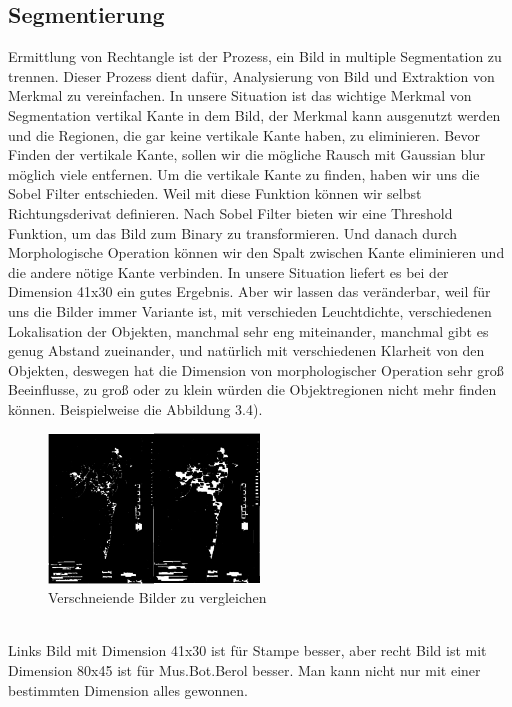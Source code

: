 \documentclass[10pt,a4paper]{report}
\begin{document}
\subsection{Segmentierung}
Ermittlung von Rechtangle ist der Prozess, ein Bild in multiple Segmentation zu trennen. Dieser Prozess dient dafür, Analysierung von Bild und Extraktion von Merkmal zu vereinfachen.\cite{5} 
In unsere Situation ist das wichtige Merkmal von Segmentation vertikal Kante in dem Bild, der Merkmal kann ausgenutzt werden und die Regionen, die gar keine vertikale Kante haben, zu eliminieren. 
Bevor Finden der vertikale Kante, sollen wir die mögliche Rausch mit Gaussian blur möglich viele entfernen. Um die vertikale Kante zu finden, haben wir uns die Sobel Filter entschieden. Weil mit diese Funktion können wir selbst Richtungsderivat definieren. 
Nach Sobel Filter bieten wir eine Threshold Funktion, um das Bild zum Binary zu transformieren. Und danach durch Morphologische Operation können wir den Spalt zwischen Kante eliminieren und die andere nötige Kante verbinden. In unsere Situation liefert es bei der Dimension 41x30 ein gutes Ergebnis. Aber wir lassen das veränderbar, weil für uns die Bilder immer Variante ist, mit verschieden Leuchtdichte, verschiedenen Lokalisation der Objekten, manchmal sehr eng miteinander, manchmal gibt es genug Abstand zueinander, und natürlich mit verschiedenen Klarheit von den Objekten, deswegen hat die Dimension von morphologischer Operation sehr groß Beeinflusse, zu groß oder zu klein würden die Objektregionen nicht mehr finden können. Beispielweise die Abbildung 3.4).\\
\begin{figure}[htbp] 
	\centering
	\includegraphics[width=0.5\textwidth]{SVMPre.png}
	\caption{Verschneiende Bilder zu vergleichen}
	\label{fig:Bild 4}
\end{figure}\\
Links Bild mit Dimension 41x30 ist für Stampe besser, aber recht Bild ist mit Dimension 80x45 ist für Mus.Bot.Berol besser. Man kann nicht nur mit einer bestimmten Dimension alles gewonnen.
\end{document}

